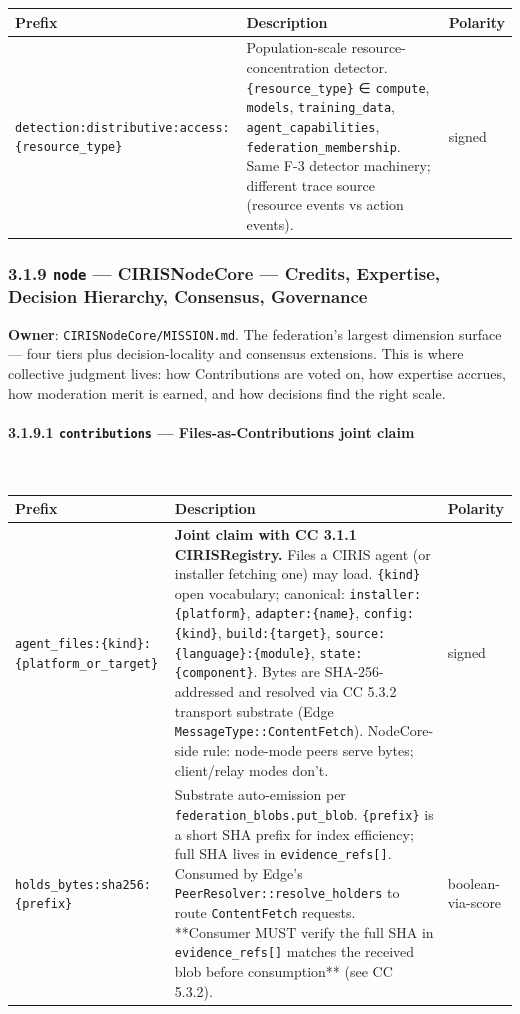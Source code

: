 \documentclass[11pt]{article}
\begin{document}
{\footnotesize
\begin{longtable}{|p{5.33cm}|p{5.33cm}|p{5.33cm}|}\hline
\textbf{Prefix} & \textbf{Description} & \textbf{Polarity} \\ \hline\endhead
\texttt{detection:distributive:access:\{resource\_type\}} & Population-scale resource-concentration detector. \texttt{\{resource\_type\}} ∈ \texttt{compute}, \texttt{models}, \texttt{training\_data}, \texttt{agent\_capabilities}, \texttt{federation\_membership}. Same F-3 detector machinery; different trace source (resource events vs action events). & signed \\ \hline
\end{longtable}}


\subsubsection*{3.1.9 \texttt{node} — CIRISNodeCore — Credits, Expertise, Decision Hierarchy, Consensus, Governance}


\textbf{Owner}: \texttt{CIRISNodeCore/MISSION.md}. The federation's largest dimension surface — four tiers plus decision-locality and consensus extensions. This is where collective judgment lives: how Contributions are voted on, how expertise accrues, how moderation merit is earned, and how decisions find the right scale.


\paragraph{3.1.9.1 \texttt{contributions} — Files-as-Contributions joint claim}\mbox{}\\


{\footnotesize
\begin{longtable}{|p{5.33cm}|p{5.33cm}|p{5.33cm}|}\hline
\textbf{Prefix} & \textbf{Description} & \textbf{Polarity} \\ \hline\endhead
\texttt{agent\_files:\{kind\}:\{platform\_or\_target\}} & \textbf{Joint claim with CC 3.1.1 CIRISRegistry.} Files a CIRIS agent (or installer fetching one) may load. \texttt{\{kind\}} open vocabulary; canonical: \texttt{installer:\{platform\}}, \texttt{adapter:\{name\}}, \texttt{config:\{kind\}}, \texttt{build:\{target\}}, \texttt{source:\{language\}:\{module\}}, \texttt{state:\{component\}}. Bytes are SHA-256-addressed and resolved via CC 5.3.2 transport substrate (Edge \texttt{MessageType::ContentFetch}). NodeCore-side rule: node-mode peers serve bytes; client/relay modes don't. & signed \\ \hline
\texttt{holds\_bytes:sha256:\{prefix\}} & Substrate auto-emission per \texttt{federation\_blobs.put\_blob}. \texttt{\{prefix\}} is a short SHA prefix for index efficiency; full SHA lives in \texttt{evidence\_refs[]}. Consumed by Edge's \texttt{PeerResolver::resolve\_holders} to route \texttt{ContentFetch} requests. **Consumer MUST verify the full SHA in \texttt{evidence\_refs[]} matches the received blob before consumption** (see CC 5.3.2). & boolean-via-score \\ \hline
\end{longtable}}
\end{document}

